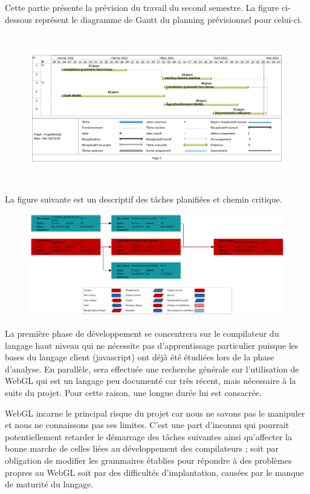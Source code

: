 
Cette partie présente la prévision du travail du second semestre. La figure ci-dessous représent le diagramme de Gantt du planning prévisionnel pour celui-ci.

\begin{figure}[h]
 \centering
 \includegraphics[width=\textwidth,height=6.5cm]{strategie/diag_gantt}
\end{figure}

La figure suivante est un descriptif des tâches planifiées et chemin critique.

\begin{figure}[h]
 \centering
 \includegraphics[width=\textwidth]{strategie/org_desc_tach}
\end{figure}

La première phase de développement se concentrera sur le compilateur du langage haut niveau qui ne nécessite pas d’apprentissage particulier 
puisque les bases du langage client (javascript) ont déjà été  étudiées lors de la phase d’analyse. 
En parallèle, sera effectuée une recherche générale sur l’utilisation de WebGL qui est un langage peu documenté car très récent, 
mais nécessaire à la suite du projet. Pour cette raison, une longue durée lui est consacrée.


WebGL incarne le principal risque du projet car nous ne savons pas le manipuler et nous ne connaissons pas ses limites.
 C’est une part d’inconnu qui pourrait potentiellement retarder le démarrage des tâches suivantes ainsi qu’affecter la bonne marche de celles 
liées au développement des compilateurs ; soit par obligation de modifier les grammaires établies pour répondre à des problèmes propres au WebGL 
soit par des difficultés d’implantation, causées par le manque de maturité du langage.


